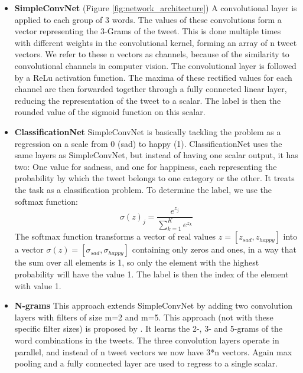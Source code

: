\documentclass[10pt,conference,compsocconf]{IEEEtran}
\begin{document}
\begin{itemize}
    \item 
    \textbf{SimpleConvNet} (Figure \ref{fig:network_architecture})
    A convolutional layer is applied to each group of 3 words. The values of these convolutions form a vector representing the 3-Grams of the tweet. This is done multiple times with different weights in the convolutional kernel, forming an array of n tweet vectors. We refer to these n vectors as channels, because of the similarity to convolutional channels in computer vision. The convolutional layer is followed by a ReLu activation function. The maxima of these rectified values for each channel are then forwarded together through a fully connected linear layer, reducing the representation of the tweet to a scalar. The label is then the rounded value of the sigmoid function on this scalar.
    \item
    \textbf{ClassificationNet}
    SimpleConvNet is basically tackling the problem as a regression on a scale from 0 (sad) to happy (1). ClassificationNet uses the same layers as SimpleConvNet, but instead of having one scalar output, it has two: One value for sadness, and one for happiness, each representing the probability by which the tweet belongs to one category or the other. It treats the task as a classification problem. To determine the label, we use the softmax function:
    \[\sigma(z)_j=\frac{e^{z_j}}{\sum_{k=1}^{K}e^{z_k}}\]
    The softmax function transforms a vector of real values $z = [z_{sad}, z_{happy}]$ into a vector $\sigma(z) = [\sigma_{sad}, \sigma_{happy}]$ containing only zeros and ones, in a way that the sum over all elements is 1, so only the element with the highest probability will have the value 1. The label is then the index of the element with value 1.
    \item
    \textbf{N-grams} This approach extends SimpleConvNet by adding two convolution layers with filters of size m=2 and m=5. This approach (not with these specific filter sizes) is proposed by \cite{bentrevett}. It learns the 2-, 3- and 5-grams of the word combinations in the tweets. The three convolution layers operate in parallel, and instead of n tweet vectors we now have 3*n vectors. Again max pooling and a fully connected layer are used to regress to a single scalar.
    
\end{itemize}
\end{document}
